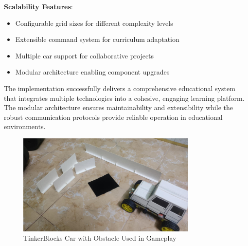 \textbf{Scalability Features}:
\begin{itemize}
    \item Configurable grid sizes for different complexity levels
    \item Extensible command system for curriculum adaptation
    \item Multiple car support for collaborative projects
    \item Modular architecture enabling component upgrades
\end{itemize}

The implementation successfully delivers a comprehensive educational system that integrates multiple technologies into a cohesive, engaging learning platform. The modular architecture ensures maintainability and extensibility while the robust communication protocols provide reliable operation in educational environments.

\begin{figure}[H]
    \centering
    \includegraphics[width=0.8\textwidth]{assets/car_and_walls.png}
    \caption{TinkerBlocks Car with Obstacle Used in Gameplay}
    \label{fig:car_obstacles}
\end{figure}